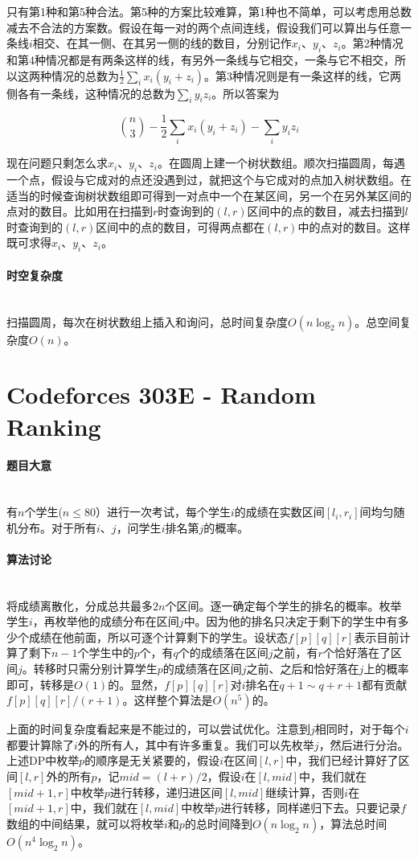 \documentclass[UTF8]{ctexart}
\newcommand{\myparagraph}[1]{\paragraph{#1}\mbox{}\\}
\theoremstyle{nonumberplain}
\begin{document}
			只有第1种和第5种合法。第5种的方案比较难算，第1种也不简单，可以考虑用总数减去不合法的方案数。假设在每一对的两个点间连线，假设我们可以算出与任意一条线$i$相交、在其一侧、在其另一侧的线的数目，分别记作$x_i$、$y_i$、$z_i$。第2种情况和第4种情况都是有两条这样的线，有另外一条线与它相交，一条与它不相交，所以这两种情况的总数为$\frac{1}{2}\sum_i x_i(y_i+z_i)$。第3种情况则是有一条这样的线，它两侧各有一条线，这种情况的总数为$\sum_i y_i z_i$。所以答案为
			
			$$ \binom{n}{3}-\frac{1}{2}\sum_i x_i(y_i+z_i)-\sum_i y_i z_i $$
			
			现在问题只剩怎么求$x_i$、$y_i$、$z_i$。在圆周上建一个树状数组。顺次扫描圆周，每遇一个点，假设与它成对的点还没遇到过，就把这个与它成对的点加入树状数组。在适当的时候查询树状数组即可得到一对点中一个在某区间，另一个在另外某区间的点对的数目。比如用在扫描到$r$时查询到的$(l,r)$区间中的点的数目，减去扫描到$l$时查询到的$(l,r)$区间中的点的数目，可得两点都在$(l,r)$中的点对的数目。这样既可求得$x_i$、$y_i$、$z_i$。
		
		\myparagraph{时空复杂度}
		
			扫描圆周，每次在树状数组上插入和询问，总时间复杂度$O(n\log_2n)$。总空间复杂度$O(n)$。
	
	\section{Codeforces 303E - Random Ranking}
	
		\myparagraph{题目大意}
		
			有$n$个学生($n \leq 80$）进行一次考试，每个学生$i$的成绩在实数区间$[l_i,r_i]$间均匀随机分布。对于所有$i$、$j$，问学生$i$排名第$j$的概率。
		
		\myparagraph{算法讨论}
		
			将成绩离散化，分成总共最多$2n$个区间。逐一确定每个学生的排名的概率。枚举学生$i$，再枚举他的成绩分布在区间$j$中。因为他的排名只决定于剩下的学生中有多少个成绩在他前面，所以可逐个计算剩下的学生。设状态$f[p][q][r]$表示目前计算了剩下$n-1$个学生中的$p$个，有$q$个的成绩落在区间$j$之前，有$r$个恰好落在了区间$j$。转移时只需分别计算学生$p$的成绩落在区间$j$之前、之后和恰好落在$j$上的概率即可，转移是$O(1)$的。显然，$f[p][q][r]$对$i$排名在$q+1 \sim q+r+1$都有贡献$f[p][q][r]/(r+1)$。这样整个算法是$O(n^5)$的。
			
			上面的时间复杂度看起来是不能过的，可以尝试优化。注意到$j$相同时，对于每个$i$都要计算除了$i$外的所有人，其中有许多重复。我们可以先枚举$j$，然后进行分治。上述DP中枚举$p$的顺序是无关紧要的，假设$i$在区间$[l,r]$中，我们已经计算好了区间$[l,r]$外的所有$p$，记$mid=(l+r)/2$，假设$i$在$[l,mid]$中，我们就在$[mid+1,r]$中枚举$p$进行转移，递归进区间$[l,mid]$继续计算，否则$i$在$[mid+1,r]$中，我们就在$[l,mid]$中枚举$p$进行转移，同样递归下去。只要记录$f$数组的中间结果，就可以将枚举$i$和$p$的总时间降到$O(n\log_2n)$，算法总时间$O(n^4\log_2n)$。
		
\end{document}
